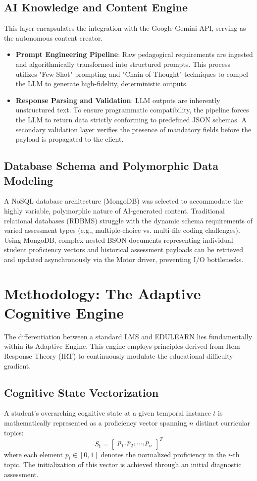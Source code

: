 \documentclass[conference]{IEEEtran}
\begin{document}
\subsection{AI Knowledge and Content Engine}
This layer encapsulates the integration with the Google Gemini API, serving as the autonomous content creator.
\begin{itemize}
    \item \textbf{Prompt Engineering Pipeline}: Raw pedagogical requirements are ingested and algorithmically transformed into structured prompts. This process utilizes "Few-Shot" prompting and "Chain-of-Thought" techniques to compel the LLM to generate high-fidelity, deterministic outputs. 
    \item \textbf{Response Parsing and Validation}: LLM outputs are inherently unstructured text. To ensure programmatic compatibility, the pipeline forces the LLM to return data strictly conforming to predefined JSON schemas. A secondary validation layer verifies the presence of mandatory fields before the payload is propagated to the client.
\end{itemize}

\subsection{Database Schema and Polymorphic Data Modeling}
A NoSQL database architecture (MongoDB) was selected to accommodate the highly variable, polymorphic nature of AI-generated content. Traditional relational databases (RDBMS) struggle with the dynamic schema requirements of varied assessment types (e.g., multiple-choice vs. multi-file coding challenges). Using MongoDB, complex nested BSON documents representing individual student proficiency vectors and historical assessment payloads can be retrieved and updated asynchronously via the Motor driver, preventing I/O bottlenecks.

\section{Methodology: The Adaptive Cognitive Engine}

The differentiation between a standard LMS and EDULEARN lies fundamentally within its Adaptive Engine. This engine employs principles derived from Item Response Theory (IRT) to continuously modulate the educational difficulty gradient.

\subsection{Cognitive State Vectorization}
A student's overarching cognitive state at a given temporal instance $t$ is mathematically represented as a proficiency vector spanning $n$ distinct curricular topics:
\begin{equation}
S_t = \begin{bmatrix} p_1, p_2, \dots, p_n \end{bmatrix}^T
\end{equation}
where each element $p_i \in [0, 1]$ denotes the normalized proficiency in the $i$-th topic. The initialization of this vector is achieved through an initial diagnostic assessment.
\end{document}
